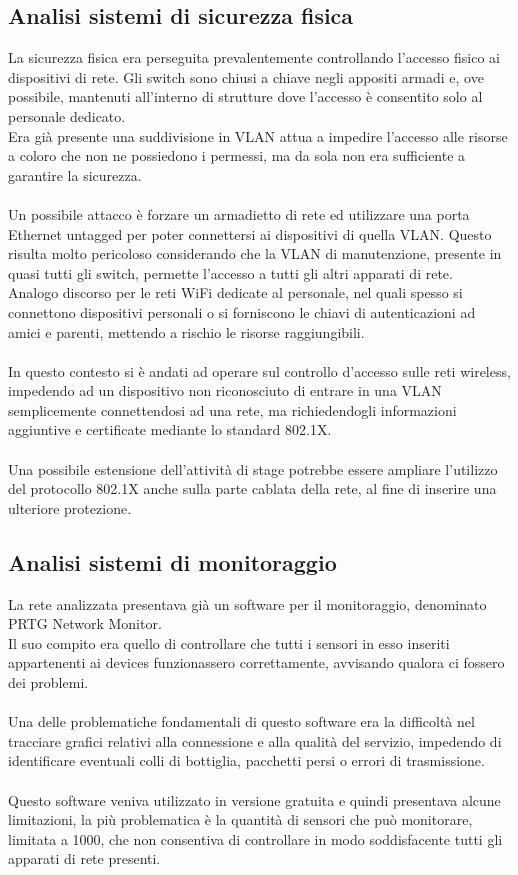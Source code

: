 \documentclass[Realizzazione.tex]{subfiles}
\begin{document}
\subsection{Analisi sistemi di sicurezza fisica}
La sicurezza fisica era perseguita prevalentemente controllando l'accesso fisico ai dispositivi di rete. Gli switch sono chiusi a chiave negli appositi armadi e, ove possibile, mantenuti all'interno di strutture dove l'accesso è consentito solo al personale dedicato. \\
Era già presente una suddivisione in VLAN attua a impedire l'accesso alle risorse a coloro che non ne possiedono i permessi, ma da sola non era sufficiente a garantire la sicurezza. \\\\
Un possibile attacco è forzare un armadietto di rete ed utilizzare una porta Ethernet untagged per poter connettersi ai dispositivi di quella VLAN. Questo risulta molto pericoloso considerando che la VLAN di manutenzione, presente in quasi tutti gli switch, permette l'accesso a tutti gli altri apparati di rete. \\
Analogo discorso per le reti WiFi dedicate al personale, nel quali spesso si connettono dispositivi personali o si forniscono le chiavi di autenticazioni ad amici e parenti, mettendo a rischio le risorse raggiungibili. \\\\
In questo contesto si è andati ad operare sul controllo d'accesso sulle reti wireless, impedendo ad un dispositivo non riconosciuto di entrare in una VLAN semplicemente connettendosi ad una rete, ma richiedendogli informazioni aggiuntive e certificate mediante lo standard 802.1X. \\\\
Una possibile estensione dell'attività di stage potrebbe essere ampliare l'utilizzo del protocollo 802.1X anche sulla parte cablata della rete, al fine di inserire una ulteriore protezione.

\newpage
\subsection{Analisi sistemi di monitoraggio}
La rete analizzata presentava già un software per il monitoraggio, denominato PRTG Network Monitor. \\
Il suo compito era quello di controllare che tutti i sensori in esso inseriti appartenenti ai devices funzionassero correttamente, avvisando qualora ci fossero dei problemi. \\\\
Una delle problematiche fondamentali di questo software era la difficoltà nel tracciare grafici relativi alla connessione e alla qualità del servizio, impedendo di identificare eventuali colli di bottiglia, pacchetti persi o errori di trasmissione. \\\\
Questo software veniva utilizzato in versione gratuita e quindi presentava alcune limitazioni, la più problematica è la quantità di sensori che può monitorare, limitata a 1000, che non consentiva di controllare in modo soddisfacente tutti gli apparati di rete presenti. \\
\end{document}
